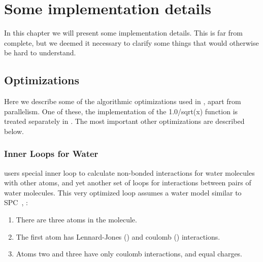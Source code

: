 %
% 
% 
% 
% 
% 
% 
% 
% 
%

\chapter{Some implementation details}
In this chapter we will present some implementation details. This is
far from complete, but we deemed it necessary to clarify some things
that would otherwise be hard to understand.


\section{Optimizations}
Here we describe some of the algorithmic optimizations used 
in {\gromacs}, apart from parallelism. 
One of these, the implementation of the 
1.0/sqrt(x) function is treated separately in .
The most important other optimizations are described below.

\subsection{Inner Loops for Water}
{\gromacs} users special inner loop to calculate non-bonded
interactions for water molecules with other atoms, and yet
another set of loops for interactions between pairs of
water molecules. This very optimized loop assumes 
a water model similar to
SPC~\cite{Berendsen81}, {\ie}:
\begin{enumerate}
\item   There are three atoms in the molecule.
\item   The first atom has Lennard-Jones () and 
        coulomb () interactions.
\item   Atoms two and three have only coulomb interactions, 
        and equal charges.
\end{enumerate}

